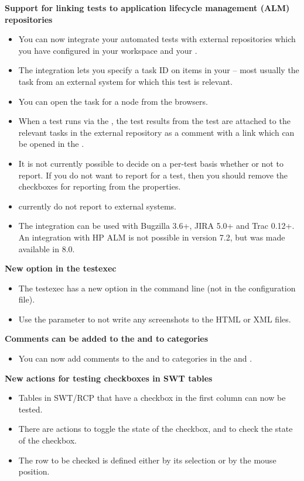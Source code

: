 \textbf{Support for linking tests to application lifecycle management (ALM) repositories}
\begin{itemize}
\item You can now integrate your automated tests with external repositories which you have configured in your workspace and your \gdproject{}.
\item The integration lets you specify a task ID on items in your \gdproject{} -- most usually the task from an external system for which this test is relevant. 
\item You can open the task for a node from the browsers. 
\item When a test runs via the \ite{}, the test results from the test are attached to the relevant tasks in the external repository as a comment with a link which can be opened in the \dash{}.
\item It is not currently possible to decide on a per-test basis whether or not to report. If you do not want to report for a test, then you should remove the checkboxes for reporting from the \gdproject{} properties. 
\item \gdjobs{} currently do not report to external systems. 
\item The integration can be used with Bugzilla 3.6+, JIRA 5.0+ and Trac 0.12+. An integration with HP ALM is not possible in version 7.2, but was made available in 8.0. 
\end{itemize}

\textbf{New option in the testexec}
\begin{itemize}
\item The testexec has a new option in the command line (not in the configuration file).
\item Use the parameter  to not write any screenshots to the HTML or XML files.
\end{itemize}

\textbf{Comments can be added to the \gdproject{} and to categories}
\begin{itemize}
\item You can now add comments to the \gdproject{} and to categories in the \gdtestsuitebrowser{} and \gdtestcasebrowser{}.
\end{itemize}

\textbf{New actions for testing checkboxes in SWT tables}
\begin{itemize}
\item Tables in SWT/RCP \gdauts{} that have a checkbox in the first column can now be tested.
\item There are actions to toggle the state of the checkbox, and to check the state of the checkbox.
\item The row to be checked is defined either by its selection or by the mouse position.
\end{itemize}

